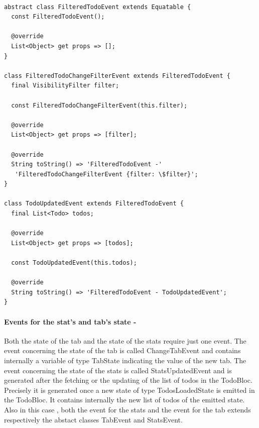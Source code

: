 \begin{code}
\mbox{}
 \mbox{}
\label{code:2.84}
\begin{verbatim}

abstract class FilteredTodoEvent extends Equatable {
  const FilteredTodoEvent();

  @override
  List<Object> get props => [];
}

class FilteredTodoChangeFilterEvent extends FilteredTodoEvent {
  final VisibilityFilter filter;

  const FilteredTodoChangeFilterEvent(this.filter);

  @override
  List<Object> get props => [filter];

  @override
  String toString() => 'FilteredTodoEvent -'
   'FilteredTodoChangeFilterEvent {filter: \$filter}';
}

class TodoUpdatedEvent extends FilteredTodoEvent {
  final List<Todo> todos;

  @override
  List<Object> get props => [todos];

  const TodoUpdatedEvent(this.todos);

  @override
  String toString() => 'FilteredTodoEvent - TodoUpdatedEvent';
}
\end{verbatim}
\mbox{}
\end{code}


\paragraph{Events for the stat’s and tab’s state - }
\label{subpar:todo_app_bloc_core_state}

Both the state of the tab and the state of the stats require just one event. The event concerning the state of the tab is called ChangeTabEvent and contains internally a variable of type TabState indicating the value of the new tab. The event concerning the state of the stats is called StatsUpdatedEvent and is generated after the fetching or the updating of the list of todos in the TodoBloc. Precisely it is generated once a new state of type TodosLoadedState is emitted in the TodoBloc. It contains internally the new list of todos of the emitted state. \\
Also in this case , both the event for the stats and the event for the tab extends respectively the abstact classes TabEvent and StatsEvent.

